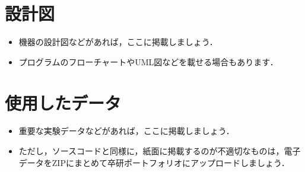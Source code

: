 \documentclass[uplatex,draft]{ipsjpapers}
\begin{document}
\section{設計図}
\begin{itemize}
\item 機器の設計図などがあれば，ここに掲載しましょう．
\item プログラムのフローチャートやUML図などを載せる場合もあります．
\end{itemize}
%
\section{使用したデータ}
\begin{itemize}
\item 重要な実験データなどがあれば，ここに掲載しましょう．
\item ただし，ソースコードと同様に，紙面に掲載するのが不適切なものは，電子データをZIPにまとめて卒研ポートフォリオにアップロードしましょう．
\end{itemize}
%
\end{document}
